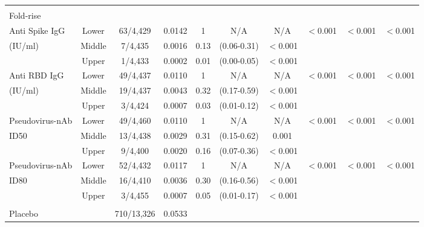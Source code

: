 \begin{tabular}{lccccccccc}
 \multicolumn{8}{l}{} \\ 
        
 \multicolumn{8}{l}{Fold-rise} \\ 
Anti Spike IgG & Lower & 63/4,429 & 0.0142 & 1 & N/A & N/A & $<$0.001 & $<$0.001 & $<$0.001 \\ 
  (IU/ml) & Middle & 7/4,435 & 0.0016 & 0.13 & (0.06-0.31) & $<$0.001 &     &     &     \\ 
   & Upper & 1/4,433 & 0.0002 & 0.01 & (0.00-0.05) & $<$0.001 &     &     &     \\ 
  Anti RBD IgG & Lower & 49/4,437 & 0.0110 & 1 & N/A & N/A & $<$0.001 & $<$0.001 & $<$0.001 \\ 
  (IU/ml) & Middle & 19/4,437 & 0.0043 & 0.32 & (0.17-0.59) & $<$0.001 &     &     &     \\ 
   & Upper & 3/4,424 & 0.0007 & 0.03 & (0.01-0.12) & $<$0.001 &     &     &     \\ 
  Pseudovirus-nAb & Lower & 49/4,460 & 0.0110 & 1 & N/A & N/A & $<$0.001 & $<$0.001 & $<$0.001 \\ 
  ID50 & Middle & 13/4,438 & 0.0029 & 0.31 & (0.15-0.62) & 0.001 &     &     &     \\ 
   & Upper & 9/4,400 & 0.0020 & 0.16 & (0.07-0.36) & $<$0.001 &     &     &     \\ 
  Pseudovirus-nAb & Lower & 52/4,432 & 0.0117 & 1 & N/A & N/A & $<$0.001 & $<$0.001 & $<$0.001 \\ 
  ID80 & Middle & 16/4,410 & 0.0036 & 0.30 & (0.16-0.56) & $<$0.001 &     &     &     \\ 
   & Upper & 3/4,455 & 0.0007 & 0.05 & (0.01-0.17) & $<$0.001 &     &     &     \\ 
    
 \multicolumn{8}{l}{} \\ 

 \multicolumn{2}{l}{Placebo} & 710/13,326&0.0533&\multicolumn{4}{l}{}  \\ 
 \hline
\end{tabular}
